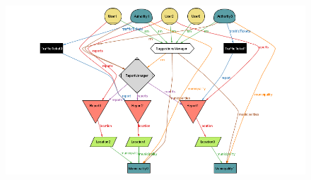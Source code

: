 \begin{itemize}
        \begin{figure}[h]
            \centering
            \includegraphics[scale=0.6]{Images/alloy_suggestions.png}
        \end{figure}
        
        \vspace{30px}
    
    
    \end{itemize}
